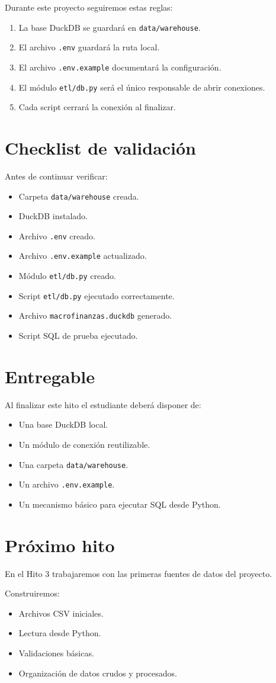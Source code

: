 Durante este proyecto seguiremos estas reglas:

\begin{enumerate}
\item La base DuckDB se guardará en \texttt{data/warehouse}.
\item El archivo \texttt{.env} guardará la ruta local.
\item El archivo \texttt{.env.example} documentará la configuración.
\item El módulo \texttt{etl/db.py} será el único responsable de abrir conexiones.
\item Cada script cerrará la conexión al finalizar.
\end{enumerate}

\section{Checklist de validación}

Antes de continuar verificar:

\begin{itemize}
\item[$\Box$] Carpeta \texttt{data/warehouse} creada.
\item[$\Box$] DuckDB instalado.
\item[$\Box$] Archivo \texttt{.env} creado.
\item[$\Box$] Archivo \texttt{.env.example} actualizado.
\item[$\Box$] Módulo \texttt{etl/db.py} creado.
\item[$\Box$] Script \texttt{etl/db.py} ejecutado correctamente.
\item[$\Box$] Archivo \texttt{macrofinanzas.duckdb} generado.
\item[$\Box$] Script SQL de prueba ejecutado.
\end{itemize}

\section{Entregable}

Al finalizar este hito el estudiante deberá disponer de:

\begin{itemize}
\item Una base DuckDB local.
\item Un módulo de conexión reutilizable.
\item Una carpeta \texttt{data/warehouse}.
\item Un archivo \texttt{.env.example}.
\item Un mecanismo básico para ejecutar SQL desde Python.
\end{itemize}

\section{Próximo hito}

En el Hito 3 trabajaremos con las primeras fuentes de datos del proyecto.

Construiremos:

\begin{itemize}
\item Archivos CSV iniciales.
\item Lectura desde Python.
\item Validaciones básicas.
\item Organización de datos crudos y procesados.
\end{itemize}
